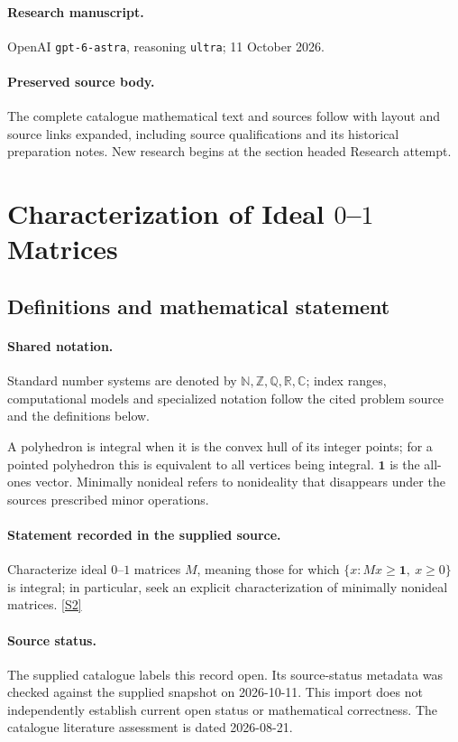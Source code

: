 \documentclass[11pt]{article}
\begin{document}
\paragraph{Research manuscript.} OpenAI \texttt{gpt-6-astra}, reasoning \texttt{ultra}; 11 October 2026.
\paragraph{Preserved source body.} The complete catalogue mathematical text and sources follow with layout and source links expanded, including source qualifications and its historical preparation notes. New research begins at the section headed Research attempt.

\section{Characterization of Ideal $0$–$1$ Matrices}\label{statement}

\subsection{Definitions and mathematical statement}

\paragraph{Shared notation.}Standard number systems are denoted by $\mathbb N,\mathbb Z,\mathbb Q,\mathbb R,\mathbb C$; index ranges, computational models and specialized notation follow the cited problem source and the definitions below.


A polyhedron is integral when it is the convex hull of its integer points; for a pointed polyhedron this is equivalent to all vertices being integral. $\mathbf1$ is the all-ones vector. Minimally nonideal refers to nonideality that disappears under the source\textquotesingle s prescribed minor operations.
\paragraph{Statement recorded in the supplied source.}
Characterize ideal $0$–$1$ matrices $M$, meaning those for which $\{x:Mx\geq\mathbf1,\ x\geq0\}$ is integral; in particular, seek an explicit characterization of minimally nonideal matrices. \href{https://doi.org/10.4171/owr/2005/50}{[S2]}
\paragraph{Source status.}
The supplied catalogue labels this record open. Its source-status metadata was checked against the supplied snapshot on 2026-10-11. This import does not independently establish current open status or mathematical correctness. The catalogue literature assessment is dated 2026-08-21.
\end{document}
